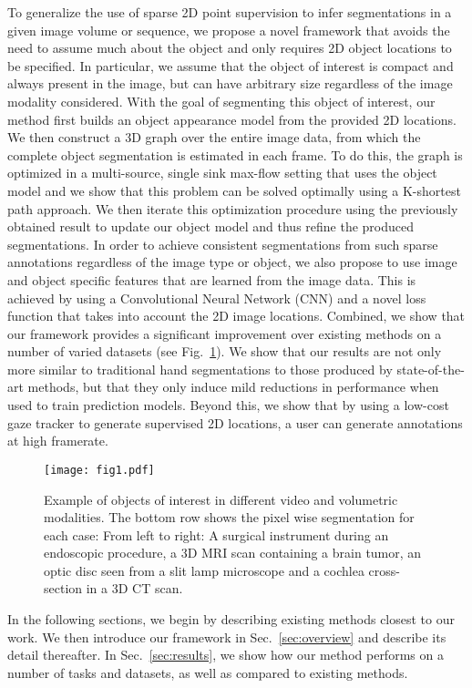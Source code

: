 To generalize the use of sparse 2D point supervision to infer segmentations in a given image volume or sequence, we propose a novel framework that avoids the need to assume much about the object and only requires 2D object locations to be specified. In particular, we assume that the object of interest is compact and always present in the image, but can have arbitrary size regardless of the image modality considered. With the goal of segmenting this object of interest, our method first builds an object appearance model from the provided 2D locations. We then construct a 3D graph over the entire image data, from which the complete object segmentation is estimated in each frame. To do this, the graph is optimized in a multi-source, single sink max-flow setting that uses the object model and we show that this problem can be solved optimally using a K-shortest path approach. We then iterate this optimization procedure using the previously obtained result to update our object model and thus refine the produced segmentations. In order to achieve consistent segmentations from such sparse annotations regardless of the image type or object, we also propose to use image and object specific features that are learned from the image data. This is achieved by using a Convolutional Neural Network (CNN) and a novel loss function that takes into account the 2D image locations. Combined, we show that our framework provides a significant improvement over existing methods on a number of varied datasets (see Fig.~\ref{fig:fig1}). We show that our results are not only more similar to traditional hand segmentations to those produced by state-of-the-art methods, but that they only induce mild reductions in performance when used to train prediction models. Beyond this, we show that by using a low-cost gaze tracker to generate supervised 2D locations, a user can generate annotations at high framerate.

\begin{figure}[t!]
\centering
\texttt{[image: fig1.pdf]}
\caption{Example of objects of interest in different video and volumetric modalities. The bottom row shows the pixel wise segmentation for each case: From left to right: A surgical instrument during an endoscopic procedure, a 3D MRI scan containing a brain tumor, an optic disc seen from a slit lamp microscope and a cochlea cross-section in a 3D CT scan.}
\label{fig:fig1}
\end{figure}
 
In the following sections, we begin by describing existing methods closest to our work. We then introduce our framework in Sec.~\ref{sec:overview} and describe its detail thereafter. In Sec.~\ref{sec:results}, we show how our method performs on a number of tasks and datasets, as well as compared to existing methods.

